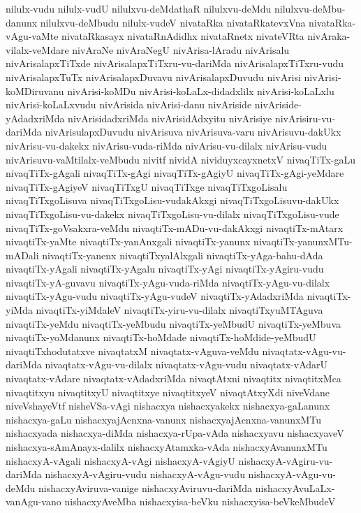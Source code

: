 {nilulx-vudu
nilulx-vudU
nilulxvu-deMdathaR
nilulxvu-deMdu
nilulxvu-deMbu-danunx
nilulxvu-deMbudu
nilulx-vudeV
nivataRka
nivataRkatevxVna
nivataRka-vAgu-vaMte
nivataRkasayx
nivataRnAdidhx
nivataRnetx
nivateVRta
nivAraka-vilalx-veMdare
nivAraNe
nivAraNegU
nivArisa-lAradu
nivArisalu
nivArisalapxTiTxde
nivArisalapxTiTxru-vu-dariMda
nivArisalapxTiTxru-vudu
nivArisalapxTuTx
nivArisalapxDuvavu
nivArisalapxDuvudu
nivArisi
nivArisi-koMDiruvanu
nivArisi-koMDu
nivArisi-koLaLx-didadxlilx
nivArisi-koLaLxlu
nivArisi-koLaLxvudu
nivArisida
nivArisi-danu
nivAriside
nivAriside-yAdadxriMda
nivArisidadxriMda
nivArisidAdxyitu
nivArisiye
nivArisiru-vu-dariMda
nivArisulapxDuvudu
nivArisuva
nivArisuva-varu
nivArisuvu-dakUkx
nivArisu-vu-dakekx
nivArisu-vuda-riMda
nivArisu-vu-dilalx
nivArisu-vudu
nivArisuvu-vaMtilalx-veMbudu
nivitf
nividA
nividuyxcayxnetxV
nivaqTiTx-gaLu
nivaqTiTx-gAgali
nivaqTiTx-gAgi
nivaqTiTx-gAgiyU
nivaqTiTx-gAgi-yeMdare
nivaqTiTx-gAgiyeV
nivaqTiTxgU
nivaqTiTxge
nivaqTiTxgoLisalu
nivaqTiTxgoLisuva
nivaqTiTxgoLisu-vudakAkxgi
nivaqTiTxgoLisuvu-dakUkx
nivaqTiTxgoLisu-vu-dakekx
nivaqTiTxgoLisu-vu-dilalx
nivaqTiTxgoLisu-vude
nivaqTiTx-goVsakxra-veMdu
nivaqtiTx-mADu-vu-dakAkxgi
nivaqtiTx-mAtarx
nivaqtiTx-yaMte
nivaqtiTx-yanAnxgali
nivaqtiTx-yanunx
nivaqtiTx-yanunxMTu-mADali
nivaqtiTx-yanenx
nivaqtiTxyalAlxgali
nivaqtiTx-yAga-bahu-dAda
nivaqtiTx-yAgali
nivaqtiTx-yAgalu
nivaqtiTx-yAgi
nivaqtiTx-yAgiru-vudu
nivaqtiTx-yA-guvavu
nivaqtiTx-yAgu-vuda-riMda
nivaqtiTx-yAgu-vu-dilalx
nivaqtiTx-yAgu-vudu
nivaqtiTx-yAgu-vudeV
nivaqtiTx-yAdadxriMda
nivaqtiTx-yiMda
nivaqtiTx-yiMdaleV
nivaqtiTx-yiru-vu-dilalx
nivaqtiTxyuMTAguva
nivaqtiTx-yeMdu
nivaqtiTx-yeMbudu
nivaqtiTx-yeMbudU
nivaqtiTx-yeMbuva
nivaqtiTx-yoMdanunx
nivaqtiTx-hoMdade
nivaqtiTx-hoMdide-yeMbudU
nivaqtiTxhodutatxve
nivaqtatxM
nivaqtatx-vAguva-veMdu
nivaqtatx-vAgu-vu-dariMda
nivaqtatx-vAgu-vu-dilalx
nivaqtatx-vAgu-vudu
nivaqtatx-vAdarU
nivaqtatx-vAdare
nivaqtatx-vAdadxriMda
nivaqtAtxni
nivaqtitx
nivaqtitxMca
nivaqtitxyu
nivaqtitxyU
nivaqtitxye
nivaqtitxyeV
nivaqtAtxyXdi
niveVdane
niveVshayeVtf
nisheVSa-vAgi
nishacxya
nishacxyakekx
nishacxya-gaLanunx
nishacxya-gaLu
nishacxyajAcnxna-vanunx
nishacxyajAcnxna-vanunxMTu
nishacxyada
nishacxya-diMda
nishacxya-rUpa-vAda
nishacxyavu
nishacxyaveV
nishacxya-sAmAnayx-dalilx
nishacxyAtamxka-vAda
nishacxyAvanunxMTu
nishacxyA-vAgali
nishacxyA-vAgi
nishacxyA-vAgiyU
nishacxyA-vAgiru-vu-dariMda
nishacxyA-vAgiru-vudu
nishacxyA-vAgu-vudu
nishacxyA-vAgu-vu-deMdu
nishacxyAviruva-vanige
nishacxyAviruvu-dariMda
nishacxyAvuLaLx-vanAgu-vano
nishacxyAveMba
nishacxyisa-beVku
nishacxyisa-beVkeMbudeV
}

